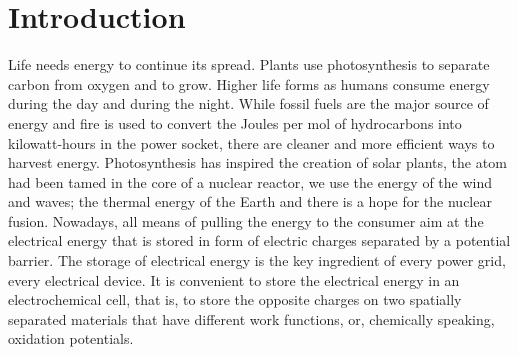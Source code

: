 \chapter{Introduction}
Life needs energy to continue its spread. Plants use photosynthesis to separate carbon from oxygen and to grow. Higher life forms as humans consume energy during the day and during the night. While fossil fuels are the major source of energy and fire is used to convert the Joules per mol of hydrocarbons into kilowatt-hours in the power socket, there are cleaner and more efficient ways to harvest energy. Photosynthesis has inspired the creation of solar plants, the atom had been tamed in the core of a nuclear reactor, we use the energy of the wind and waves; the thermal energy of the Earth and there is a hope for the nuclear fusion. Nowadays, all means of pulling the energy to the consumer aim at the electrical energy that is stored in form of electric charges separated by a potential barrier. The storage of electrical energy is the key ingredient of every power grid, every electrical device. It is convenient to store the electrical energy in an electrochemical cell, that is, to store the opposite charges on two spatially separated materials that have different work functions, or, chemically speaking, oxidation potentials. 